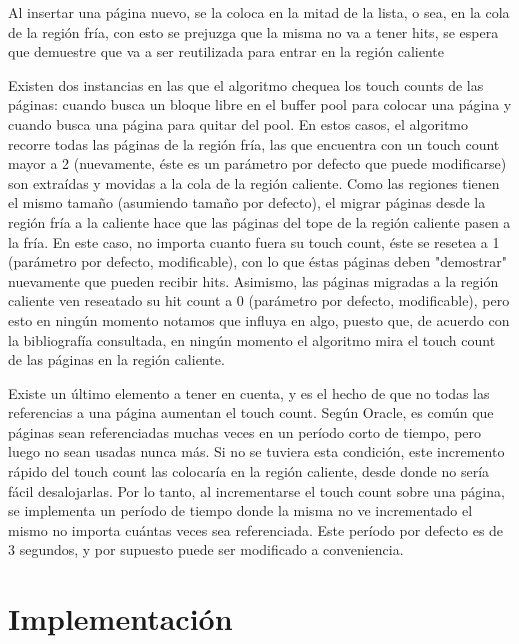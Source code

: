 Al insertar una p\'agina nuevo, se la coloca en la mitad de la lista, o sea, en la cola de la regi\'on fr\'ia, con esto se prejuzga que la misma no va a tener hits, se espera que demuestre que va a ser reutilizada para entrar en la regi\'on caliente

Existen dos instancias en las que el algoritmo chequea los touch counts de las p\'aginas: cuando busca un bloque libre en el buffer pool para colocar una p\'agina y cuando busca una p\'agina para quitar del pool. En estos casos, el algoritmo recorre todas las p\'aginas de la regi\'on fr\'ia, las que encuentra con un touch count mayor a 2 (nuevamente, \'este es un par\'ametro por defecto que puede modificarse) son extra\'idas y movidas a la cola de la regi\'on caliente. Como las regiones tienen el mismo tama\~no (asumiendo tama\~no por defecto), el migrar p\'aginas desde la regi\'on fr\'ia a la caliente hace que las p\'aginas del tope de la regi\'on caliente pasen a la fr\'ia. En este caso, no importa cuanto fuera su touch count, \'este se resetea a 1 (par\'ametro por defecto, modificable), con lo que \'estas p\'aginas deben "demostrar" nuevamente que pueden recibir hits. Asimismo, las p\'aginas migradas a la regi\'on caliente ven reseatado su hit count a 0 (par\'ametro por defecto, modificable), pero esto en ning\'un momento notamos que influya en algo, puesto que, de acuerdo con la bibliograf\'ia consultada, en ning\'un momento el algoritmo mira el touch count de las p\'aginas en la regi\'on caliente.

Existe un \'ultimo elemento a tener en cuenta, y es el hecho de que no todas las referencias a una p\'agina aumentan el touch count. Seg\'un Oracle, es com\'un que  p\'aginas sean referenciadas muchas veces en un per\'iodo corto de tiempo, pero luego no sean usadas nunca m\'as. Si no se tuviera esta condici\'on, este incremento r\'apido del touch count las colocar\'ia en la regi\'on caliente, desde donde no ser\'ia f\'acil desalojarlas. Por lo tanto, al incrementarse el touch count sobre una p\'agina, se implementa un per\'iodo de tiempo donde la misma no ve incrementado el mismo no importa cu\'antas veces sea referenciada. Este per\'iodo por defecto es de 3 segundos, y por supuesto puede ser modificado a conveniencia.

\section{Implementaci\'on}

